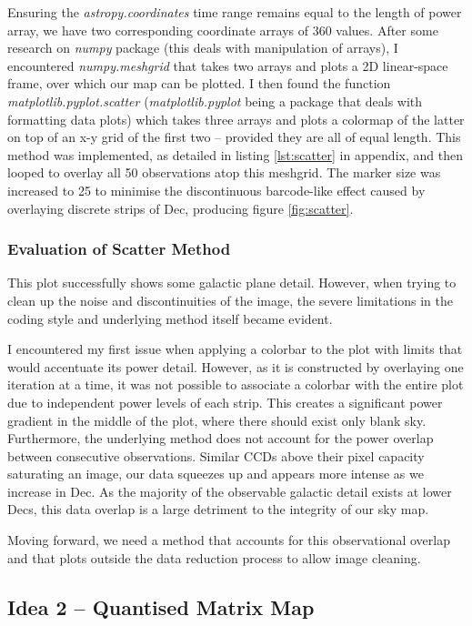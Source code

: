 \documentclass[a4paper]{jpconf}
\begin{document}
\begin{multicols}{2}
Ensuring the \textit{astropy.coordinates} time range remains equal to the length of power array, we have two corresponding coordinate arrays of 360 values. After some research on \textit{numpy} package (this deals with manipulation of arrays), I encountered \textit{numpy.meshgrid} that takes two arrays and plots a 2D linear-space frame, over which our map can be plotted. I then found the function \textit{matplotlib.pyplot.scatter} (\textit{matplotlib.pyplot} being a package that deals with formatting data plots) which takes three arrays and plots a colormap of the latter on top of an x-y grid of the first two -- provided they are all of equal length. This method was implemented, as detailed in listing \ref{lst:scatter} in appendix, and then looped to overlay all 50 observations atop this meshgrid. The marker size was increased to 25 to minimise the discontinuous barcode-like effect caused by overlaying discrete strips of Dec, producing figure \ref{fig:scatter}.

\subsubsection{Evaluation of Scatter Method} \label{idea1 eval}

This plot successfully shows some galactic plane detail. However, when trying to clean up the noise and discontinuities of the image, the severe limitations in the coding style and underlying method itself became evident.

I encountered my first issue when applying a colorbar to the plot with limits that would accentuate its power detail. However, as it is constructed by overlaying one iteration at a time, it was not possible to associate a colorbar with the entire plot due to independent power levels of each strip. This creates a significant power gradient in the middle of the plot, where there should exist only blank sky. Furthermore, the underlying method does not account for the power overlap between consecutive observations. Similar CCDs above their pixel capacity saturating an image, our data squeezes up and appears more intense as we increase in Dec. As the majority of the observable galactic detail exists at lower Decs, this data overlap is a large detriment to the integrity of our sky map.

Moving forward, we need a method that accounts for this observational overlap and that plots outside the data reduction process to allow image cleaning.

\subsection{Idea 2 -- Quantised Matrix Map} \label{idea2}


\end{multicols}
\end{document}
